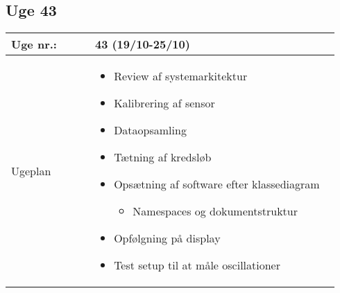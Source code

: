 	\subsection{Uge 43}
	\begin{longtable}{|p{0.24\linewidth}|p{0.7\linewidth}|}
		\hline
		Uge nr.: & 43 (19/10-25/10)\\ \hline
		Ugeplan & 
		\begin{itemize}
			\item Review af systemarkitektur 
			\item Kalibrering af sensor
			\item Dataopsamling 
			\item Tætning af kredsløb
			\item Opsætning af software efter klassediagram
			\begin{itemize}
				\item Namespaces og dokumentstruktur
			\end{itemize}
			\item Opfølgning på display 
			\item Test setup til at måle oscillationer 
		\end{itemize}
		

\end{longtable}
